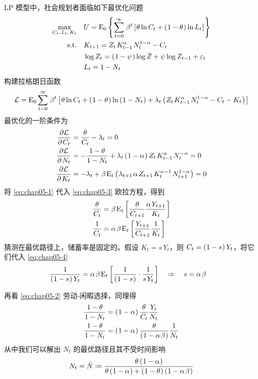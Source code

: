 LP 模型中，社会规划者面临如下最优化问题
\begin{align*}
    \max_{C_t,\,L_t,\,K_t}\quad & U=\meano\bkd{\sum_{t=0}^{\infty}\,\beta^t\bks{\theta\ln C_t+\bka{1-\theta}\ln L_t}}\\
    \text{s.t.}\quad & K\nt=Z_t\,K\lt^\alpha\,N_t^{1-\alpha}-C_t\\
        & \log Z_t=\bka{1-\psi}\log\bar{Z}+\psi\log Z\lt+\varepsilon_t\\
        & L_t=1-N_t
\end{align*}
构建拉格朗日函数
\begin{equation*}
    \mathcal{L}=\meano\sum^\infty_{t=0}\,\beta^t\bks{\theta\ln C_t+\bka{1-\theta}\ln\bka{1-N_t}+\lambda_t\bka{Z_t\,K\lt^\alpha\,N_t^{1-\alpha}-C_t-K_t}}
\end{equation*}
最优化的一阶条件为
\begin{align}
    \frac{\partial\mathcal{L}}{\p C_t}&=\frac{\theta}{C_t}-\lambda_t=0\label{eq:chap05-1}\\
    \frac{\partial\mathcal{L}}{\p N_t}&=-\frac{1-\theta}{1-N_t}+\lambda_t\bka{1-\alpha}Z_t\,K\lt^\alpha\,N_t^{-\alpha}=0\label{eq:chap05-2}\\
    \frac{\partial\mathcal{L}}{\p K_t}&=-\lambda_t+\beta\,\meant\bka{\lambda_{t+1}\,\alpha \,Z_{t+1}\,K_{t}^{\alpha-1}\,N_{t+1}^{1-\alpha}}=0\label{eq:chap05-3}
\end{align}
将 \ref{eq:chap05-1} 代入 \ref{eq:chap05-3} 欧拉方程，得到
\begin{align}
    \dfrac{\theta}{C_t}&=\beta\,\meant\bks{\dfrac{\theta}{C_{t+1}}\dfrac{\alpha\,Y\nt}{K_t}}\notag\\
    \frac{1}{C_t}&=\alpha\,\beta\,\meant\bks{\frac{Y\nt}{C_{t+1}}\frac{1}{K_t}}
    \label{eq:chap05-4}
\end{align}
猜测在最优路径上，储蓄率是固定的。假设 \(K_t=s\,Y_t\)，则 \(C_t=\left(\mspace{1mu}1-s\mspace{1mu}\right)Y_t\)，将它们代入 \ref{eq:chap05-4}
\begin{align*}
    \dfrac{1}{\bka{1-s}Y_t}&=\alpha\,\beta\,\meant\bks{\dfrac{1}{\bka{1-s}}\cdot\dfrac{1}{s\,Y_t}}\quad\Rightarrow\quad s=\alpha\,\beta
\end{align*}

再看 \ref{eq:chap05-2} 劳动-闲暇选择，同理得
\begin{align*}
    \dfrac{1-\theta}{1-N_t}&=\bka{1-\alpha}\dfrac\theta{C_t}\dfrac{Y_t}{N_t}\\
    \dfrac{1-\theta}{1-N_t}&=\bka{1-\alpha}\dfrac\theta{\bka{1-\alpha\,\beta}}\dfrac{1}{N_t}
\end{align*}
从中我们可以解出 \(N_t\) 的最优路径且其不受时间影响
\begin{equation}
    N_t=\bar N\coloneq\frac{\theta\bka{1-\alpha}}{\theta\bka{1-\alpha}+\bka{1-\theta}\bka{1-\alpha\,\beta}}
\end{equation}

